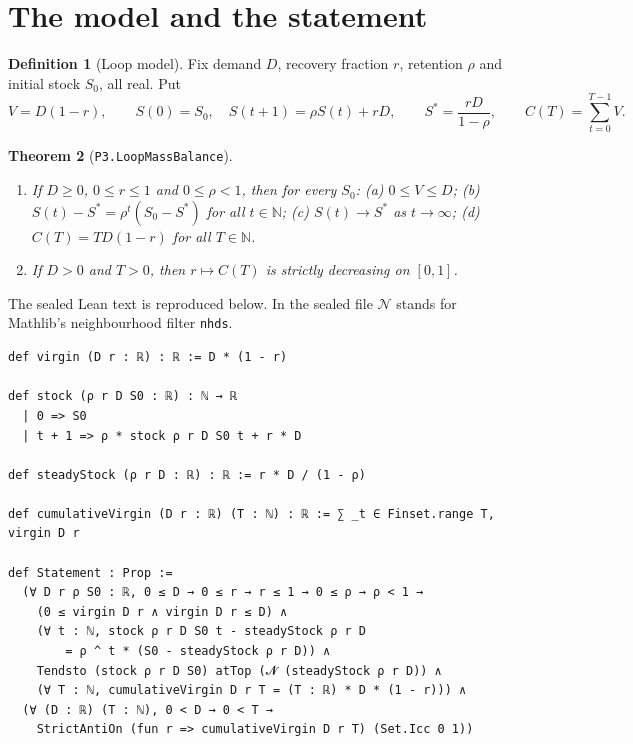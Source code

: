 \documentclass[11pt]{article}
\newtheorem{theorem}{Theorem}
\theoremstyle{definition}
\newtheorem{definition}[theorem]{Definition}
\theoremstyle{remark}
\begin{document}
\section{The model and the statement}
\label{sec:model}
\begin{definition}[Loop model]
Fix demand $D$, recovery fraction $r$, retention $\rho$ and initial stock $S_0$, all real. Put
\[
V = D(1-r),\qquad S(0)=S_0,\quad S(t+1)=\rho S(t)+rD,\qquad S^\ast=\frac{rD}{1-\rho},
\qquad C(T)=\sum_{t=0}^{T-1}V .
\]
\end{definition}

\begin{theorem}[\texttt{P3.LoopMassBalance}]\label{thm:main}
\begin{enumerate}
\item If $D\ge0$, $0\le r\le1$ and $0\le\rho<1$, then for every $S_0$:
 (a) $0\le V\le D$;
 (b) $S(t)-S^\ast=\rho^t(S_0-S^\ast)$ for all $t\in\mathbb{N}$;
 (c) $S(t)\to S^\ast$ as $t\to\infty$;
 (d) $C(T)=TD(1-r)$ for all $T\in\mathbb{N}$.
\item If $D>0$ and $T>0$, then $r\mapsto C(T)$ is strictly decreasing on $[0,1]$.
\end{enumerate}
\end{theorem}

The sealed Lean text is reproduced below. In the sealed file $\mathcal{N}$ stands for
Mathlib's neighbourhood filter \texttt{nhds}.

\begin{lstlisting}[caption={Definitions and \texttt{Statement} from the sealed module \texttt{ViridisStatements.P3.LoopMassBalance} (docstrings omitted).}]
def virgin (D r : ℝ) : ℝ := D * (1 - r)

def stock (ρ r D S0 : ℝ) : ℕ → ℝ
  | 0 => S0
  | t + 1 => ρ * stock ρ r D S0 t + r * D

def steadyStock (ρ r D : ℝ) : ℝ := r * D / (1 - ρ)

def cumulativeVirgin (D r : ℝ) (T : ℕ) : ℝ := ∑ _t ∈ Finset.range T, virgin D r

def Statement : Prop :=
  (∀ D r ρ S0 : ℝ, 0 ≤ D → 0 ≤ r → r ≤ 1 → 0 ≤ ρ → ρ < 1 →
    (0 ≤ virgin D r ∧ virgin D r ≤ D) ∧
    (∀ t : ℕ, stock ρ r D S0 t - steadyStock ρ r D
        = ρ ^ t * (S0 - steadyStock ρ r D)) ∧
    Tendsto (stock ρ r D S0) atTop (𝓝 (steadyStock ρ r D)) ∧
    (∀ T : ℕ, cumulativeVirgin D r T = (T : ℝ) * D * (1 - r))) ∧
  (∀ (D : ℝ) (T : ℕ), 0 < D → 0 < T →
    StrictAntiOn (fun r => cumulativeVirgin D r T) (Set.Icc 0 1))
\end{lstlisting}
\end{document}
